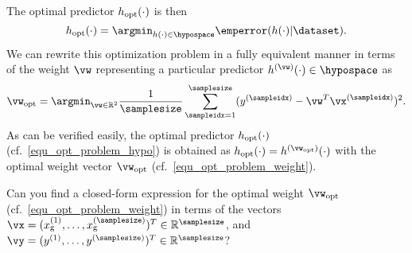 \documentclass[article,11pt]{article}
\begin{document}
The optimal predictor $h_{\rm opt}(\cdot)$ is then
\vspace*{-3mm}
\begin{equation}
\label{equ_opt_problem_hypo}
h_{\rm opt}(\cdot)  = \argmin_{h(\cdot) \in \hypospace}  \emperror(h(\cdot) | \dataset). 
\vspace*{-2mm}
\end{equation}
We can rewrite this optimization problem in a fully equivalent manner in terms of the weight 
$\vw$ representing a particular predictor $h^{(\vw)}(\cdot) \in \hypospace$ as 
\vspace*{-5mm}
\begin{equation}
\label{equ_opt_problem_weight}
\vw_{\rm opt} = \argmin_{\vw \in \mathbb{R}^{2}}   \frac{1}{\samplesize}\sum^{\samplesize}_{\sampleidx=1}(y^{(\sampleidx)} - \vw^{T} \vx^{(\sampleidx)})^2. 
\vspace{-3mm}
\end{equation}
As can be verified easily, the optimal predictor $h_{\rm opt}(\cdot)$ (cf.\ \eqref{equ_opt_problem_hypo}) is obtained as 
$h_{\rm opt}(\cdot) = h^{(\vw_{\rm opt})}(\cdot)$ with the optimal weight vector $\vw_{\rm opt}$ (cf.\ \eqref{equ_opt_problem_weight}).

Can you find a closed-form expression for the optimal weight $\vw_{\rm opt}$ (cf.\ \eqref{equ_opt_problem_weight}) in terms of the vectors 
$\vx = (x_{\rm g}^{(1)},\ldots,x_{\rm g}^{(\samplesize)})^{T} \in \mathbb{R}^{\samplesize}$, and $\vy = (y^{(1)}, \ldots,y^{(\samplesize)})^{T}\in \mathbb{R}^{\samplesize}$?
\end{document}

